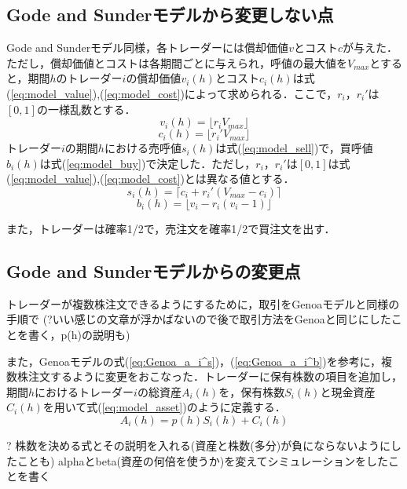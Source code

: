 \documentclass[titlepage]{jsreport}
\begin{document}
\subsection{Gode and Sunderモデルから変更しない点}
Gode and Sunderモデル同様，各トレーダーには償却価値$v$とコスト$c$が与えた．ただし，償却価値とコストは各期間ごとに与えられ，呼値の最大値を$V_{max}$とすると，期間$h$のトレーダー$i$の償却価値$v_i(h)$とコスト$c_i(h)$は式(\ref{eq:model_value}),(\ref{eq:model_cost})によって求められる．ここで，$r_i$，$r_i'$は$[0, 1]$の一様乱数とする．
\begin{equation}
    v_i(h) = \lfloor r_i V_{max} \rfloor \label{eq:model_value}
\end{equation}
\begin{equation}
    c_i(h) = \lfloor r_i' V_{max} \rfloor \label{eq:model_cost}
\end{equation}
トレーダー$i$の期間$h$における売呼値$s_i(h)$は式(\ref{eq:model_sell})で，買呼値$b_i(h)$は式(\ref{eq:model_buy})で決定した．ただし，$r_i$，$r_i'$は$[0, 1]$は式(\ref{eq:model_value}),(\ref{eq:model_cost})とは異なる値とする．
\begin{equation}
    s_i(h) = \lceil c_i + r_i' (V_{max} - c_i) \rceil \label{eq:model_sell}
\end{equation}
\begin{equation}
    b_i(h) = \lfloor v_i - r_i (v_i - 1) \rfloor \label{eq:model_buy}
\end{equation}

また，トレーダーは確率1/2で，売注文を確率1/2で買注文を出す．

\subsection{Gode and Sunderモデルからの変更点}
トレーダーが複数株注文できるようにするために，取引をGenoaモデルと同様の手順で
(?いい感じの文章が浮かばないので後で取引方法をGenoaと同じにしたことを書く，p(h)の説明も)

また，Genoaモデルの式(\ref{eq:Genoa_a_i^s})，(\ref{eq:Genoa_a_i^b})を参考に，複数株注文するように変更をおこなった．トレーダーに保有株数の項目を追加し，期間$h$におけるトレーダー$i$の総資産$A_i(h)$を，保有株数$S_i(h)$と現金資産$C_i(h)$を用いて式(\ref{eq:model_asset})のように定義する．
\begin{equation}
    A_i(h) = p(h) S_i(h) + C_i(h) \label{eq:model_asset}
\end{equation}

? 株数を決める式とその説明を入れる(資産と株数(多分)が負にならないようにしたことも)
alphaとbeta(資産の何倍を使うか)を変えてシミュレーションをしたことを書く
\end{document}
